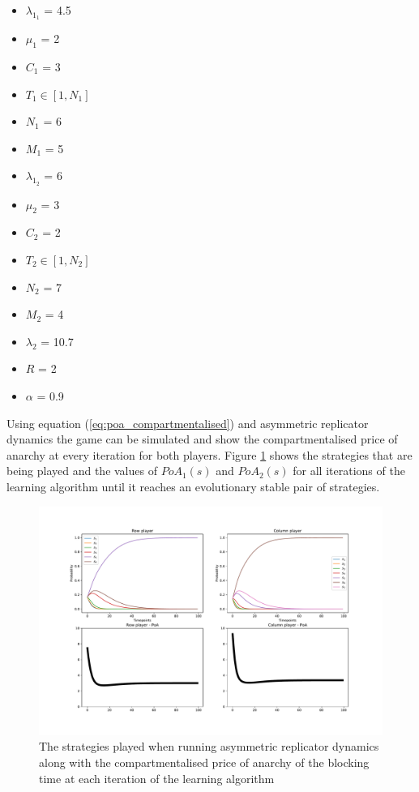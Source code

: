 \begin{multicols}{3}
    \begin{itemize}        
        \item \( \lambda_{1_1} \) = 4.5
        \item \( \mu_1 \) = 2
        \item \( C_1 \) = 3
        \item \( T_1 \in [1, N_1] \) 
        \item \( N_1 \) = 6
        \item \( M_1 \) = 5

        \columnbreak
        \item \( \lambda_{1_2} \) = 6
        \item \( \mu_2 \) = 3
        \item \( C_2 \) = 2
        \item \( T_2 \in [1, N_2] \)
        \item \( N_2 \) = 7
        \item \( M_2 \) = 4
        
        \columnbreak
        \item \( \lambda_2 \) = 10.7
        \item \( R \) = 2
        \item \( \alpha \) = 0.9
    \end{itemize}
\end{multicols}

Using equation (\ref{eq:poa_compartmentalised}) and asymmetric replicator 
dynamics the game can be simulated and show the compartmentalised price of 
anarchy at every iteration for both players.
Figure \ref{fig:ard_original} shows the strategies that are being played and 
the values of \(PoA_1(s)\) and \(PoA_2(s)\) for all iterations of the 
learning algorithm until it reaches an evolutionary stable pair of strategies.

\begin{figure}[H]
    \includegraphics[width=\textwidth, trim=0 400 0 0]{imgs/asymmetric_rd_and_PoA/asymmetric_original.pdf}
    \caption{The strategies played when running asymmetric replicator dynamics
    along with the compartmentalised price of anarchy of the blocking time at
    each iteration of the learning algorithm}
    \label{fig:ard_original}
\end{figure}

